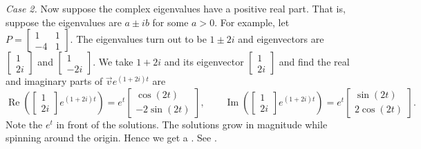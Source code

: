 \medskip

\emph{Case 2.} Now suppose the complex eigenvalues have a positive real
part.  That is, suppose the eigenvalues are $a \pm ib$ for some $a > 0$.
For example, let $P = 
\left[ \begin{smallmatrix} 1 & 1 \\ -4 & 1 \end{smallmatrix} \right]$.
The eigenvalues turn out to be $1\pm 2i$ and eigenvectors are
$\left[ \begin{smallmatrix} 1 \\ 2i \end{smallmatrix} \right]$ and
$\left[ \begin{smallmatrix} 1 \\ -2i \end{smallmatrix} \right]$.  We take
$1 + 2i$ and its eigenvector
$\left[ \begin{smallmatrix} 1 \\ 2i \end{smallmatrix} \right]$ and find
the real and imaginary parts of
$\vec{v} e^{(1+2i)t}$ are
\begin{equation*}
\operatorname{Re}\left(
\begin{bmatrix} 1 \\ 2i \end{bmatrix} e^{(1+2i)t}\right) =
e^t
\begin{bmatrix} \cos (2t) \\ -2 \sin (2t)  \end{bmatrix} ,
\qquad
\operatorname{Im}\left(
\begin{bmatrix} 1 \\ 2i \end{bmatrix} e^{(1+2i)t} \right)=
e^t
\begin{bmatrix} \sin (2t) \\ 2 \cos (2t) \end{bmatrix} .
\end{equation*}
Note the $e^t$ in front of the solutions.  The solutions
grow in magnitude while spinning around the origin.  Hence we get
a \emph{}.
See .

\medskip

